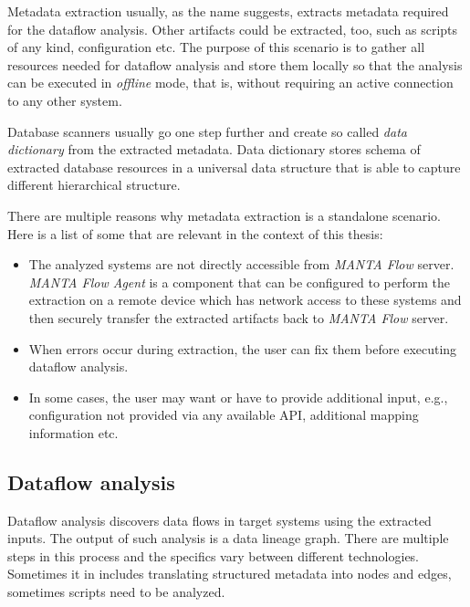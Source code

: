 Metadata extraction usually, as the name suggests, extracts metadata required for the dataflow analysis. Other artifacts could be extracted, too, such as scripts of any kind, configuration etc. The purpose of this scenario is to gather all resources needed for dataflow analysis and store them locally so that the analysis can be executed in \textit{offline} mode, that is, without requiring an active connection to any other system.
\par
Database scanners usually go one step further and create so called \textit{data dictionary} from the extracted metadata. Data dictionary stores schema of extracted database resources in a universal data structure that is able to capture different hierarchical structure.
\par
There are multiple reasons why metadata extraction is a standalone scenario. Here is a list of some that are relevant in the context of this thesis:
\begin{itemize}
    \item The analyzed systems are not directly accessible from \textit{MANTA Flow} server. \textit{MANTA Flow Agent} is a component that can be configured to perform the extraction on a remote device which has network access to these systems and then securely transfer the extracted artifacts back to \textit{MANTA Flow} server. 
    \item When errors occur during extraction, the user can fix them before executing dataflow analysis.
    \item In some cases, the user may want or have to provide additional input, e.g., configuration not provided via any available API, additional mapping information etc.
\end{itemize}

\subsection{Dataflow analysis}

Dataflow analysis discovers data flows in target systems using the extracted inputs. The output of such analysis is a data lineage graph. There are multiple steps in this process and the specifics vary between different technologies. Sometimes it in includes translating structured metadata into nodes and edges, sometimes scripts need to be analyzed.


